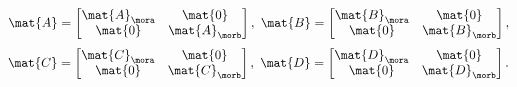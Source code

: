 \begin{example}
    \begin{equation}\label{eq:LTI-stacking-mor1}
        \mat{A}=\begin{bmatrix}
            \mat{A}_\mora & \mat{0}       \\
            \mat{0}       & \mat{A}_\morb
        \end{bmatrix},\
        \mat{B}=\begin{bmatrix}
            \mat{B}_\mora & \mat{0}       \\
            \mat{0}       & \mat{B}_\morb
        \end{bmatrix},
    \end{equation}
    \begin{equation}\label{eq:LTI-stacking-mor2}
        \mat{C}=\begin{bmatrix}
            \mat{C}_\mora & \mat{0}       \\
            \mat{0}       & \mat{C}_\morb
        \end{bmatrix},\
        \mat{D}=\begin{bmatrix}
            \mat{D}_\mora & \mat{0}       \\
            \mat{0}       & \mat{D}_\morb
        \end{bmatrix}.
    \end{equation}


\end{example}
